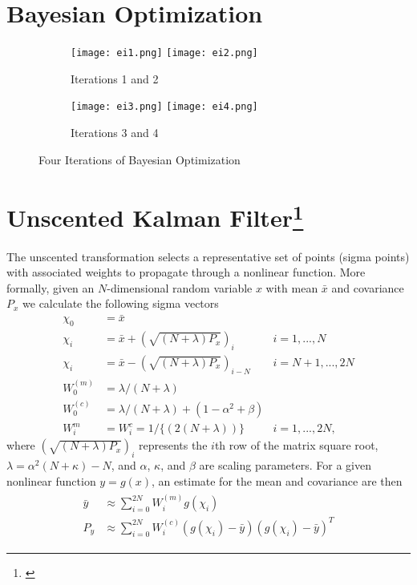 \begin{appendices}

\chapter{Bayesian Optimization}

\begin{figure}[h]
\begin{subfigure}{\textwidth}
\texttt{[image: ei1.png]}\hfill
\texttt{[image: ei2.png]}
\caption{Iterations 1 and 2}
\end{subfigure}
\par\medskip
\begin{subfigure}{\textwidth}
\texttt{[image: ei3.png]}\hfill
\texttt{[image: ei4.png]}
\caption{Iterations 3 and 4}
\end{subfigure}
\caption{Four Iterations of Bayesian Optimization}
\label{fig:ei}
\end{figure}

\chapter{Unscented Kalman Filter\footnote{\citet{Wan00theunscented}}}\label{ch:append-ukf}
The unscented transformation selects a representative set of points (sigma points) with associated weights to propagate through a nonlinear function. More formally, given an $N$-dimensional random variable $x$ with mean $\bar{x}$ and covariance $P_x$ we calculate the following sigma vectors 
\begin{equation}\label{eq:unscentedtransform}
\begin{aligned}
  \chi_0 &= \bar{x}\\
  \chi_i &= \bar{x} + (\sqrt{(N + \lambda)P_x})_i & i = 1, ..., N \\
  \chi_i &= \bar{x} - (\sqrt{(N + \lambda)P_x})_{i-N} & i = N + 1, ..., 2N\\
  W_0^{(m)} &= \lambda /(N + \lambda) \\
  W_0^{(c)} &= \lambda /(N + \lambda) + (1- \alpha^2 + \beta)\\
  W_i^m &= W_i^c = 1/\{(2(N + \lambda))\} & i = 1, ..., 2N,
\end{aligned}
\end{equation}
where $(\sqrt{(N + \lambda)P_x})_i$ represents the $i$th row of the matrix square root, $\lambda = \alpha^2(N + \kappa) - N$, and $\alpha$, $\kappa$, and $\beta$ are scaling parameters. For a given nonlinear function $y=g(x)$, an estimate for the mean and covariance are then
\begin{align}
\begin{split}
  \bar{y} &\approx \sum_{i=0}^{2N} W_i^{(m)}g(\chi_i)\\
  P_y &\approx \sum_{i=0}^{2N} W_i^{(c)}(g(\chi_i) - \bar{y})(g(\chi_i) - \bar{y})^T
\end{split}
\end{align}


\end{appendices}
